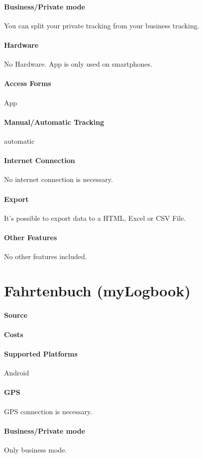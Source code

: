 \paragraph{Business/Private mode} You can split your private tracking from your business tracking.
\paragraph{Hardware} No Hardware. App is only used on smartphones.
\paragraph{Access Forms} App
\paragraph{Manual/Automatic Tracking} automatic
\paragraph{Internet Connection} No internet connection is necessary.
\paragraph{Export} It’s possible to export data to a HTML, Excel or CSV File.
\paragraph{Other Features} No other features included.
\newpage
\section{Fahrtenbuch (myLogbook)}
\paragraph{Source} 
\paragraph{Costs} 
\paragraph{Supported Platforms} Android 
\paragraph{GPS} GPS connection is necessary.
\paragraph{Business/Private mode} Only business mode.

